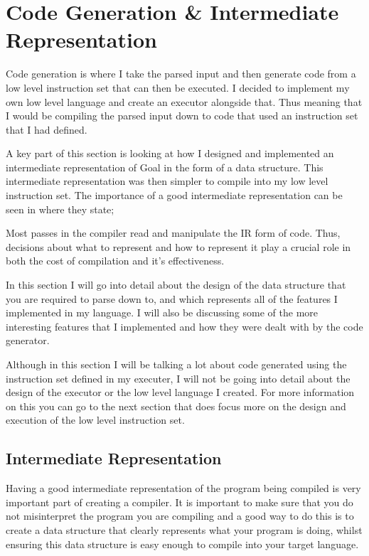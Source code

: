
\chapter{Code Generation \& Intermediate Representation}

Code generation is where I take the parsed input and then generate code from a low level instruction set that can then be executed. I decided to implement my own low level language and create an executor alongside that. Thus meaning that I would be compiling the parsed input down to code that used an instruction set that I had defined.

A key part of this section is looking at how I designed and implemented an intermediate representation of Goal in the form of a data structure. This intermediate representation was then simpler to compile into my low level instruction set. The importance of a good intermediate representation can be seen in \cite[p.~221]{EngComp2012} where they state;

\begin{displayquote}
Most passes in the compiler read and manipulate the IR form of code. Thus, decisions about what to represent and how to represent it play a  crucial role in both the cost of compilation and it's effectiveness. 
\end{displayquote}

In this section I will go into detail about the design of the data structure that you are required to parse down to, and which represents all of the features I implemented in my language. I will also be discussing some of the more interesting features that I implemented and how they were dealt with by the code generator.

Although in this section I will be talking a lot about code generated using the instruction set defined in my executer, I will not be going into detail about the design of the executor or the low level language I created. For more information on this you can go to the next section that does focus more on the design and execution of the low level instruction set.


\section{Intermediate Representation}

Having a good intermediate representation of the program being compiled is very important part of creating a compiler. It is important to make sure that you do not misinterpret the program you are compiling and a good way to do this is to create a data structure that clearly represents what your program is doing, whilst ensuring this data structure is easy enough to compile into your target language.


